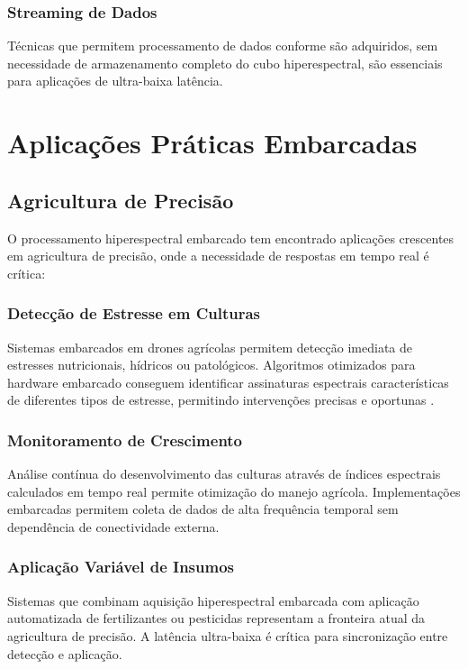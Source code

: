 \subsubsection{Streaming de Dados}
Técnicas que permitem processamento de dados conforme são adquiridos, sem necessidade de armazenamento completo do cubo hiperespectral, são essenciais para aplicações de ultra-baixa latência.

\section{Aplicações Práticas Embarcadas}\label{sec:aplicacoes_praticas}

\subsection{Agricultura de Precisão}
O processamento hiperespectral embarcado tem encontrado aplicações crescentes em agricultura de precisão, onde a necessidade de respostas em tempo real é crítica:

\subsubsection{Detecção de Estresse em Culturas}
Sistemas embarcados em drones agrícolas permitem detecção imediata de estresses nutricionais, hídricos ou patológicos. Algoritmos otimizados para hardware embarcado conseguem identificar assinaturas espectrais características de diferentes tipos de estresse, permitindo intervenções precisas e oportunas \cite{Shin2024}.

\subsubsection{Monitoramento de Crescimento}
Análise contínua do desenvolvimento das culturas através de índices espectrais calculados em tempo real permite otimização do manejo agrícola. Implementações embarcadas permitem coleta de dados de alta frequência temporal sem dependência de conectividade externa.

\subsubsection{Aplicação Variável de Insumos}
Sistemas que combinam aquisição hiperespectral embarcada com aplicação automatizada de fertilizantes ou pesticidas representam a fronteira atual da agricultura de precisão. A latência ultra-baixa é crítica para sincronização entre detecção e aplicação.

